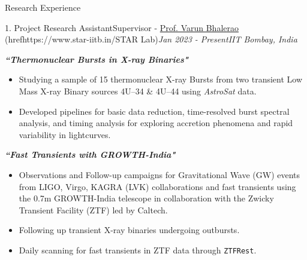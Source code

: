 \vspace{-0.7em}
\begin{section}{Research Experience}

    \begin{subsectionnobullet1}{1. Project Research Assistant}{Supervisor - \href{https://www.phy.iitb.ac.in/en/content/varun-bhalerao}{Prof. Varun Bhalerao} (href{https://www.star-iitb.in/}{STAR Lab})}{\textit{Jan 2023 - Present}}{\textit{IIT Bombay, India}}{}

        \vspace{-0.5em}

        \textbf{\textit{``Thermonuclear Bursts in X-ray Binaries"}}
        \vspace{-0.5em}
        \begin{itemize}
            \item Studying a sample of 15 thermonuclear X-ray Bursts from two transient Low Mass X-ray Binary sources 4U--34 \& 4U--44 using \textit{AstroSat} data.
            \vspace{-0.5em}
            \item Developed pipelines for basic data reduction, time-resolved burst spectral analysis, and timing analysis for exploring accretion phenomena and rapid variability in lightcurves.
        \end{itemize}
        \vspace{-0.5em}
        \textbf{\textit{``Fast Transients with GROWTH-India"}}
        \vspace{-0.5em}
        \begin{itemize}
            \item Observations and Follow-up campaigns for Gravitational Wave (GW) events from LIGO, Virgo, KAGRA (LVK) collaborations and fast transients using the 0.7m GROWTH-India telescope in collaboration with the Zwicky Transient Facility (ZTF) led by Caltech. 
            \vspace{-0.5em}
            \item Following up transient X-ray binaries undergoing outbursts.
            \vspace{-0.5em}
            \item Daily scanning for fast transients in ZTF data through \texttt{ZTFRest}.
        \end{itemize}
        
    \end{subsectionnobullet1}


\end{section}
